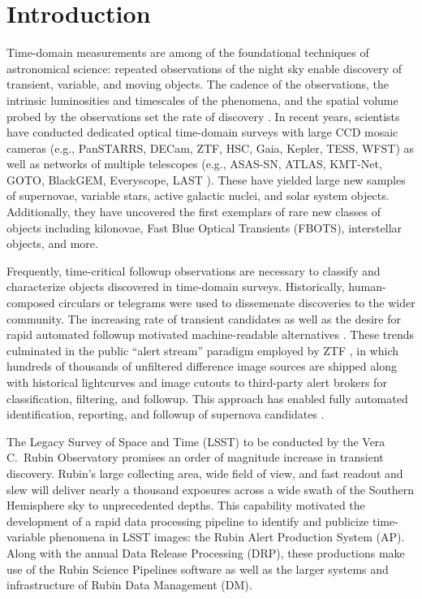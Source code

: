 \section{Introduction}

Time-domain measurements are among of the foundational techniques of astronomical science:
repeated observations of the night sky enable discovery of transient, variable, and moving objects.
The cadence of the observations, the intrinsic luminosities and timescales of the phenomena, and the spatial volume probed by the observations set the rate of discovery \citep{Bellm:16:Cadences}. 
In recent years, scientists have conducted dedicated optical time-domain surveys with large CCD mosaic cameras (e.g., PanSTARRS, DECam, ZTF, HSC, Gaia, Kepler, TESS, WFST) as well as networks of multiple telescopes (e.g., ASAS-SN, ATLAS, KMT-Net, GOTO, BlackGEM, Everyscope, LAST  ).
These have yielded large new samples of supernovae, variable stars, active galactic nuclei, and solar system objects.
Additionally, they have uncovered the first exemplars of rare new classes of objects including kilonovae, Fast Blue Optical Transients (FBOTS), interstellar objects, and more. 

Frequently, time-critical followup observations are necessary to classify and characterize objects discovered in time-domain surveys.
Historically, human-composed circulars or telegrams were used to dissemenate discoveries to the wider community.
The increasing rate of transient candidates as well as the desire for rapid automated followup motivated machine-readable alternatives .
These trends culminated in the public ``alert stream'' paradigm employed by ZTF \citep{Patterson:19:ZTFAlertDistribution}, in which hundreds of thousands of unfiltered difference image sources are shipped along with historical lightcurves and image cutouts to third-party alert brokers for classification, filtering, and followup.
This approach has enabled fully automated identification, reporting, and followup of supernova candidates .

The Legacy Survey of Space and Time (LSST) to be conducted by the Vera C.\ Rubin Observatory \citep{2019ApJ...873..111I} promises an order of magnitude increase in transient discovery.
Rubin's large collecting area, wide field of view, and fast readout and slew will deliver nearly a thousand  exposures across a wide swath of the Southern Hemisphere sky to unprecedented depths.
This capability motivated the development of a rapid data processing pipeline to identify and publicize time-variable phenomena in LSST images: the Rubin Alert Production System (AP).
Along with the annual Data Release Processing (DRP), these productions make use of the Rubin Science Pipelines software as well as the larger systems and infrastructure of Rubin Data Management (DM).


